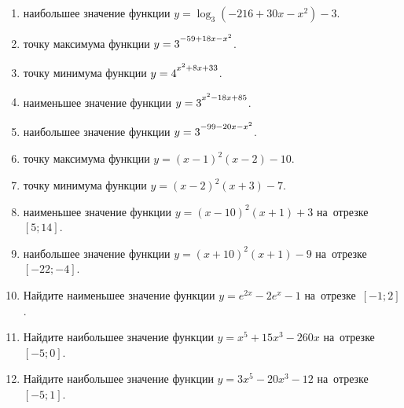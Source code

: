 \documentclass[a4paper,10pt]{article}
\begin{document}
\begin{enumerate}
\item {} наибольшее значение функции $y=\log_3\left(-216+30x-x^2\right)-3$.

\item {} точку максимума функции $y=3\strut^{-59+18x-x^2}$.

\item {} точку минимума функции $y=4\strut^{x^2+8x+33}$.

\item {} наименьшее значение функции $y=3\strut^{x^2-18x+85}$.

\item {} наибольшее значение функции $y=3\strut^{-99-20x-x^2}$.

\item {} точку максимума функции $y=\left(x-1\right)^2\left(x-2\right)-10$.

\item {} точку минимума функции $y=\left(x-2\right)^2\left(x+3\right)-7$.

\item {} наименьшее значение функции $y=\left(x-10\right)^2\left(x+1\right)+3$ на~отрезке~$\left[5;14\right]$.

\item {} наибольшее значение функции $y=\left(x+10\right)^2\left(x+1\right)-9$ на~отрезке~$\left[-22;-4\right]$.

\item Найдите наименьшее значение функции $y=e^{2x}-2e^x-1$ на~отрезке~$\left[-1;2\right]$.

\item Найдите наибольшее значение функции $y=x^5+15x^3-260x$ на~отрезке~$\left[-5;0\right]$.

\item Найдите наибольшее значение функции $y=3x^5-20x^3-12$ на~отрезке~$\left[-5;1\right]$.

\end{enumerate}
\end{document}
